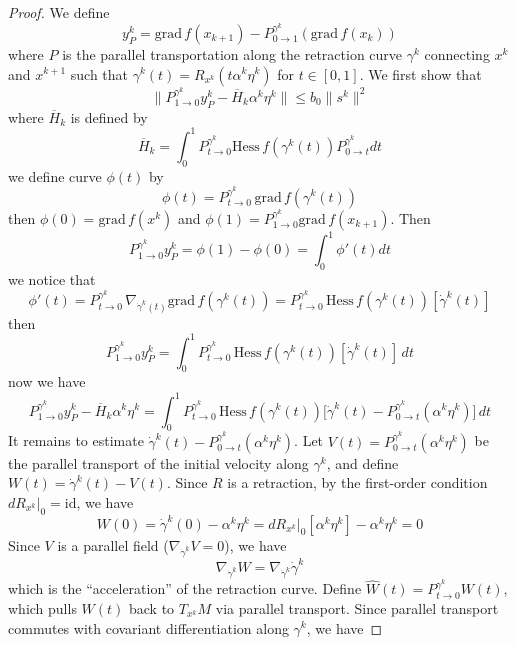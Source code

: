 \documentclass[12pt,a4paper,draft]{article}  %
\theoremstyle{definition}
\numberwithin{equation}{section}
\newcommand{\grad}{\mathrm{grad}\,}
\newcommand{\hess}{\mathrm{Hess}\,}
\begin{document}
\begin{proof}
        We define
        \[
        y^k_P = \grad f(x_{k+1}) - P^{\gamma^k}_{0\to 1}(\grad f(x_k))
        \]
        where $P$ is the parallel transportation along the retraction curve $\gamma^k$ connecting $x^k$ and $x^{k+1}$ such that $\gamma^k(t) = R_{x^k}(t\alpha^k\eta^k)$ for $t\in [0,1]$. We first show that
        \begin{equation}
                \|P^{\gamma^k}_{1\to 0}y^k_P-\overline{H}_k\alpha^k\eta^k\| \leq b_0\|s^k\|^2
        \end{equation}
        where $\overline{H}_k$ is defined by
        \begin{equation}
                \overline{H}_k = \int_0^1 P^{\gamma^k}_{t\to 0}\hess f(\gamma^k(t))P^{\gamma^k}_{0\to t}dt
        \end{equation}
        we define curve $\phi(t)$ by
        \[
        \phi(t) = P^{\gamma^k}_{t\to 0}\,\grad f(\gamma^k(t))
        \]
        then $\phi(0) = \grad f(x^k)$ and $\phi(1) = P^{\gamma^k}_{1\to 0}\grad f(x_{k+1})$. Then
        \[
        P^{\gamma^k}_{1\to 0}y^k_P = \phi(1) - \phi(0) = \int_0^1 \phi'(t)dt 
        \]
        we notice that
        \[
        \phi'(t) = P^{\gamma^k}_{t\to 0}\,\nabla_{\dot{\gamma}^k(t)}\grad f(\gamma^k(t)) = P^{\gamma^k}_{t\to 0}\,\hess f(\gamma^k(t))[\dot{\gamma}^k(t)]
        \]
        then
        \[
        P^{\gamma^k}_{1\to 0}y^k_P = \int_0^1 P^{\gamma^k}_{t\to 0}\,\hess f(\gamma^k(t))[\dot{\gamma}^k(t)]\,dt
        \]
        now we have
        \[
        P^{\gamma^k}_{1\to 0}y^k_P - \overline{H}_k\alpha^k\eta^k = \int_0^1 P^{\gamma^k}_{t\to 0}\,\hess f(\gamma^k(t))\Big[\dot{\gamma}^k(t) - P^{\gamma^k}_{0\to t}(\alpha^k\eta^k)\Big]\,dt
        \]
        It remains to estimate $\dot{\gamma}^k(t) - P^{\gamma^k}_{0\to t}(\alpha^k\eta^k)$. Let $V(t) = P^{\gamma^k}_{0\to t}(\alpha^k\eta^k)$ be the parallel transport of the initial velocity along $\gamma^k$, and define $W(t) = \dot{\gamma}^k(t) - V(t)$. Since $R$ is a retraction, by the first-order condition $dR_{x^k}\big|_0 = \mathrm{id}$, we have
        \[
        W(0) = \dot{\gamma}^k(0) - \alpha^k\eta^k = dR_{x^k}\big|_0[\alpha^k\eta^k] - \alpha^k\eta^k = 0
        \]
        Since $V$ is a parallel field ($\nabla_{\dot{\gamma}^k}V = 0$), we have
        \[
        \nabla_{\dot{\gamma}^k}W = \nabla_{\dot{\gamma}^k}\dot{\gamma}^k
        \]
        which is the ``acceleration'' of the retraction curve. Define $\hat{W}(t) = P^{\gamma^k}_{t\to 0}W(t)$, which pulls $W(t)$ back to $T_{x^k}M$ via parallel transport. Since parallel transport commutes with covariant differentiation along $\gamma^k$, we have

\end{proof}
\end{document}
